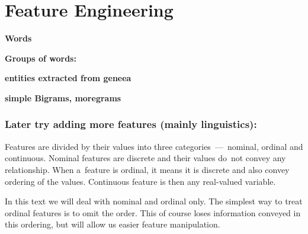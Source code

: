\chapter{Feature Engineering}
\label{chap:fea}


\bf Words \rm





\bf Groups of words: \rm

\bf entities extracted from geneea \rm



\bf simple Bigrams, moregrams\rm


\subsection{Later try adding more features (mainly linguistics):}









Features are divided by their values into three categories~---~nominal, ordinal and continuous. Nominal features are discrete and their values do~not convey any relationship. When a~feature is ordinal, it means it is discrete and also convey ordering of the values. Continuous feature is then any real-valued variable.

In this text we will deal with nominal and ordinal only. The simplest way to treat ordinal features is to omit the order. This of course loses information conveyed in this ordering, but will allow us easier feature manipulation.

